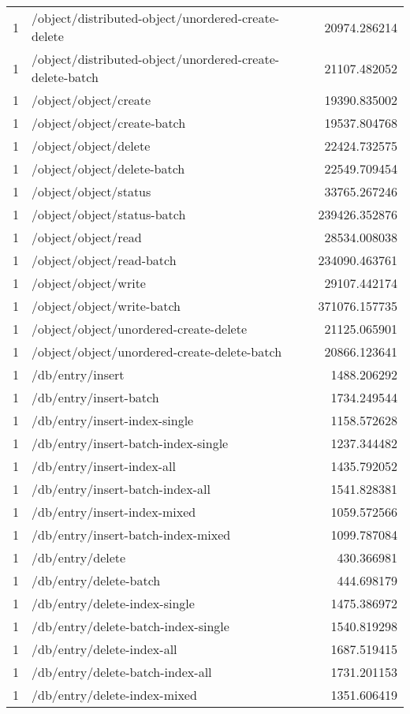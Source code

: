 \begin{longtable}{rlr}
1 & /object/distributed-object/unordered-create-delete & 20974.286214 \\
1 & /object/distributed-object/unordered-create-delete-batch & 21107.482052 \\
1 & /object/object/create & 19390.835002 \\
1 & /object/object/create-batch & 19537.804768 \\
1 & /object/object/delete & 22424.732575 \\
1 & /object/object/delete-batch & 22549.709454 \\
1 & /object/object/status & 33765.267246 \\
1 & /object/object/status-batch & 239426.352876 \\
1 & /object/object/read & 28534.008038 \\
1 & /object/object/read-batch & 234090.463761 \\
1 & /object/object/write & 29107.442174 \\
1 & /object/object/write-batch & 371076.157735 \\
1 & /object/object/unordered-create-delete & 21125.065901 \\
1 & /object/object/unordered-create-delete-batch & 20866.123641 \\
1 & /db/entry/insert & 1488.206292 \\
1 & /db/entry/insert-batch & 1734.249544 \\
1 & /db/entry/insert-index-single & 1158.572628 \\
1 & /db/entry/insert-batch-index-single & 1237.344482 \\
1 & /db/entry/insert-index-all & 1435.792052 \\
1 & /db/entry/insert-batch-index-all & 1541.828381 \\
1 & /db/entry/insert-index-mixed & 1059.572566 \\
1 & /db/entry/insert-batch-index-mixed & 1099.787084 \\
1 & /db/entry/delete & 430.366981 \\
1 & /db/entry/delete-batch & 444.698179 \\
1 & /db/entry/delete-index-single & 1475.386972 \\
1 & /db/entry/delete-batch-index-single & 1540.819298 \\
1 & /db/entry/delete-index-all & 1687.519415 \\
1 & /db/entry/delete-batch-index-all & 1731.201153 \\
1 & /db/entry/delete-index-mixed & 1351.606419 \\

\end{longtable}
